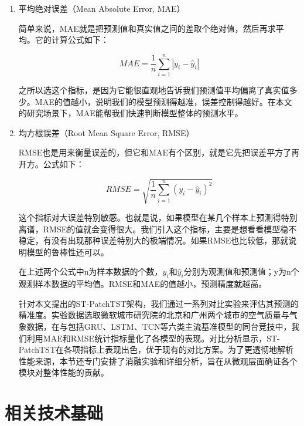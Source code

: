 \begin{enumerate}[label=（\arabic*）, leftmargin=0pt, itemindent=4.5em, labelsep=0.5em, listparindent=2em, parsep=0pt,]

    \item 平均绝对误差（Mean Absolute Error, MAE）

    简单来说，MAE就是把预测值和真实值之间的差取个绝对值，然后再求平均。它的计算公式如下：

    \begin{equation}
        MAE = \frac{1}{n} \sum_{i=1}^{n} |y_i - \hat{y}_i|
    \end{equation}

    之所以选这个指标，是因为它能很直观地告诉我们预测值平均偏离了真实值多少。MAE的值越小，说明我们的模型预测得越准，误差控制得越好。在本文的研究场景下，MAE能帮我们快速判断模型整体的预测水平。

    \item 均方根误差（Root Mean Square Error, RMSE）
    
    RMSE也是用来衡量误差的，但它和MAE有个区别，就是它先把误差平方了再开方。公式如下：

    \begin{equation}
        RMSE = \sqrt{\frac{1}{n} \sum_{i=1}^{n} (y_i - \hat{y}_i)^2}
    \end{equation}

    这个指标对大误差特别敏感。也就是说，如果模型在某几个样本上预测得特别离谱，RMSE的值就会变得很大。我们引入这个指标，主要是想看看模型稳不稳定，有没有出现那种误差特别大的极端情况。如果RMSE也比较低，那就说明模型的鲁棒性还可以。

    在上述两个公式中n为样本数据的个数，$y_i$和$\hat{y}_i$分别为观测值和预测值；y为n个观测样本数据的平均值。RMSE和MAE的值越小，预测精度就越高。

    针对本文提出的ST-PatchTST架构，我们通过一系列对比实验来评估其预测的精准度。实验数据选取微软城市研究院的北京和广州两个城市的空气质量与气象数据，在与包括GRU、LSTM、TCN等六类主流基准模型的同台竞技中，我们利用MAE和RMSE统计指标量化了各模型的表现。对比分析显示，ST-PatchTST在各项指标上表现出色，优于现有的对比方案。为了更透彻地解析性能来源，本节还专门安排了消融实验和详细分析，旨在从微观层面确证各个模块对整体性能的贡献。

\end{enumerate}

\section{相关技术基础}

